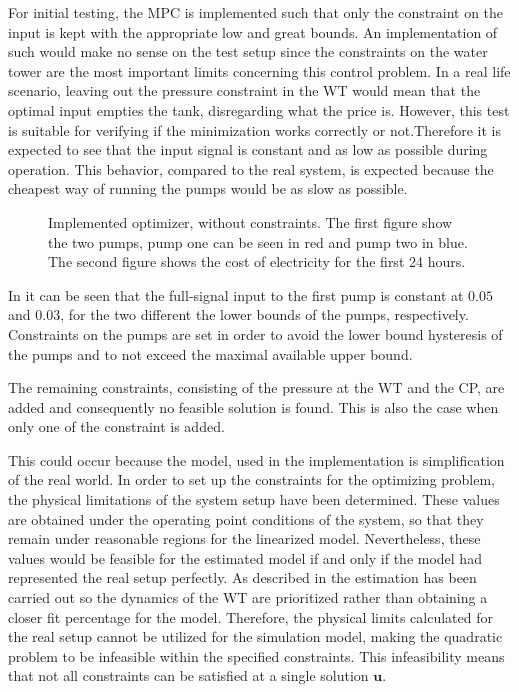 For initial testing, the MPC is implemented such that only the constraint on the input is kept with the appropriate low and great bounds. An implementation of such would make no sense on the test setup since the constraints on the water tower are the most important limits concerning this control problem. In a real life scenario, leaving out the pressure constraint in the WT would mean that the optimal input empties the tank, disregarding what the price is. However, this test is suitable for verifying if the minimization works correctly or not.Therefore it is expected to see that the input signal is constant and as low as possible during operation. This behavior, compared to the real system, is expected because the cheapest way of running the pumps would be as slow as possible. 

\begin{figure}[H]
\centering
 
\caption{Implemented optimizer, without constraints. The first figure show the two pumps, pump one can be seen in red and pump two in blue. The second figure shows the cost of electricity for the first 24 hours.}
\label{fig:Implementation_shit}
\end{figure}

In  it can be seen that the full-signal input to the first pump is constant at $0.05$ and $0.03$, for the two different the lower bounds of the pumps, respectively. Constraints on the pumps are set in order to avoid the lower bound hysteresis of the pumps and to not exceed the maximal available upper bound. 

The remaining constraints, consisting of the pressure at the WT and the CP, are added and consequently no feasible solution is found. This is also the case when only one of the constraint is added. 

This could occur because the model, used in the implementation is simplification of the real world. In order to set up the constraints for the optimizing problem, the physical limitations of the system setup have been determined. These values are obtained under the operating point conditions of the system, so that they remain under reasonable regions for the linearized model. Nevertheless, these values would be feasible for the estimated model if and only if the model had represented the real setup perfectly. As described in  the estimation has been carried out so the dynamics of the WT are prioritized rather than obtaining a closer fit percentage for the model. Therefore, the physical limits calculated for the real setup cannot be utilized for the simulation model, making the quadratic problem to be infeasible within the specified constraints. This infeasibility means that not all constraints can be satisfied at a single solution $\bm{u}$.

